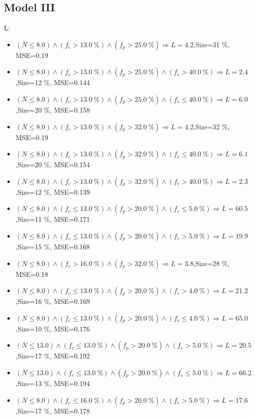 \documentclass[numbered]{CSL}
\begin{document}
\subsection{Model III}
L:
\begin{itemize}
\item $(N \leq 8.0) \land (f_c > 13.0~\%) \land (f_p > 25.0~\%) \Rightarrow L = 4.2$,\hfill Size=31 \%, MSE=0.19
\item $(N \leq 8.0) \land (f_c > 13.0~\%) \land (f_p > 25.0~\%) \land (f_c > 40.0~\%) \Rightarrow L = 2.4$,\hfill Size=12 \%, MSE=0.144
\item $(N \leq 8.0) \land (f_c > 13.0~\%) \land (f_p > 25.0~\%) \land (f_c \leq 40.0~\%) \Rightarrow L = 6.0$,\hfill Size=20 \%, MSE=0.158
\item $(N \leq 8.0) \land (f_c > 13.0~\%) \land (f_p > 32.0~\%) \Rightarrow L = 4.2$,\hfill Size=32 \%, MSE=0.19
\item $(N \leq 8.0) \land (f_c > 13.0~\%) \land (f_p > 32.0~\%) \land (f_c \leq 40.0~\%) \Rightarrow L = 6.1$,\hfill Size=20 \%, MSE=0.154
\item $(N \leq 8.0) \land (f_c > 13.0~\%) \land (f_p > 32.0~\%) \land (f_c > 40.0~\%) \Rightarrow L = 2.3$,\hfill Size=12 \%, MSE=0.139
\item $(N \leq 8.0) \land (f_c \leq 13.0~\%) \land (f_p > 20.0~\%) \land (f_c \leq 5.0~\%) \Rightarrow L = 60.5$,\hfill Size=11 \%, MSE=0.171
\item $(N \leq 8.0) \land (f_c \leq 13.0~\%) \land (f_p > 20.0~\%) \land (f_c > 5.0~\%) \Rightarrow L = 19.9$,\hfill Size=15 \%, MSE=0.168
\item $(N \leq 8.0) \land (f_c > 16.0~\%) \land (f_p > 32.0~\%) \Rightarrow L = 3.8$,\hfill Size=28 \%, MSE=0.18
\item $(N \leq 8.0) \land (f_c \leq 13.0~\%) \land (f_p > 20.0~\%) \land (f_c > 4.0~\%) \Rightarrow L = 21.2$,\hfill Size=16 \%, MSE=0.169
\item $(N \leq 8.0) \land (f_c \leq 13.0~\%) \land (f_p > 20.0~\%) \land (f_c \leq 4.0~\%) \Rightarrow L = 65.0$,\hfill Size=10 \%, MSE=0.176
\item $(N \leq 13.0) \land (f_c \leq 13.0~\%) \land (f_p > 20.0~\%) \land (f_c > 5.0~\%) \Rightarrow L = 20.5$,\hfill Size=17 \%, MSE=0.192
\item $(N \leq 13.0) \land (f_c \leq 13.0~\%) \land (f_p > 20.0~\%) \land (f_c \leq 5.0~\%) \Rightarrow L = 66.2$,\hfill Size=13 \%, MSE=0.194
\item $(N \leq 8.0) \land (f_c \leq 16.0~\%) \land (f_p > 20.0~\%) \land (f_c > 5.0~\%) \Rightarrow L = 17.6$,\hfill Size=17 \%, MSE=0.178

\end{itemize}
\end{document}
